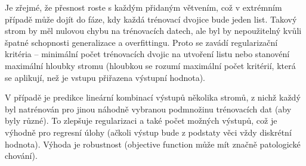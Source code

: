 Je zřejmé, že přesnost roste s každým přidaným větvením, což v extrémním případě může dojít do fáze, kdy každá trénovací dvojice bude jeden list. 
Takový strom by měl nulovou chybu na trénovacích datech, ale byl by nepoužitelný kvůli špatné schopnosti generalizace a overfittingu. Proto se zavádí 
regularizační kritéria -- minimální počet trénovacích dvojic na utvoření listu nebo stanovéní maximální hloubky stromu (hloubkou se rozumí maximální 
počet kritérií, která se aplikují, než je vstupu přiřazena výstupní hodnota). 

V případě  je predikce lineární kombinací výstupů několika stromů, z nichž každý byl natrénován pro jinou náhodně vybranou 
podmnožinu trénovacích dat (aby byly různé). To zlepšuje regularizaci a také počet možných výstupů, což je výhodně pro regresní úlohy (ačkoli 
výstup bude z podstaty věci vždy diskrétní hodnota). 
Výhoda  je robustnost (objective function může mít značně patologické chování). 

% 
% 
% 
% 

